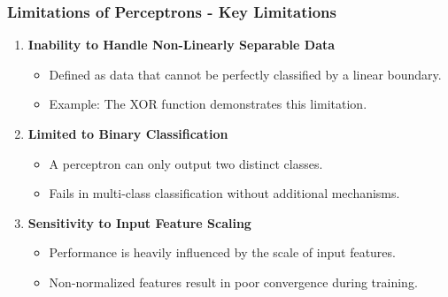\documentclass[aspectratio=169]{beamer}
\begin{document}
\begin{frame}[fragile]
    \frametitle{Limitations of Perceptrons - Key Limitations}
    \begin{enumerate}
        \item \textbf{Inability to Handle Non-Linearly Separable Data}
        \begin{itemize}
            \item Defined as data that cannot be perfectly classified by a linear boundary.
            \item Example: The XOR function demonstrates this limitation.
        \end{itemize}

        \item \textbf{Limited to Binary Classification}
        \begin{itemize}
            \item A perceptron can only output two distinct classes.
            \item Fails in multi-class classification without additional mechanisms.
        \end{itemize}

        \item \textbf{Sensitivity to Input Feature Scaling}
        \begin{itemize}
            \item Performance is heavily influenced by the scale of input features.
            \item Non-normalized features result in poor convergence during training.
        \end{itemize}
    \end{enumerate}
\end{frame}
\end{document}

